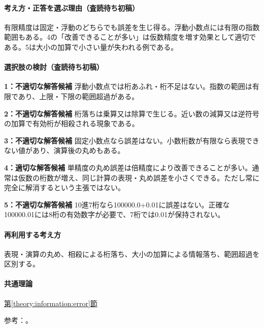 \paragraph{考え方・正答を選ぶ理由（査読待ち初稿）} 有限精度は固定・浮動のどちらでも誤差を生じ得る。浮動小数点には有限の指数範囲もある。4の「改善できることが多い」は仮数精度を増す効果として適切である。5は大小の加算で小さい量が失われる例である。

\paragraph{選択肢の検討（査読待ち初稿）}\mbox{}\par

\noindent\textbf{1：不適切な解答候補} 浮動小数点では桁あふれ・桁不足はない。指数の範囲は有限であり、上限・下限の範囲超過がある。\par

\noindent\textbf{2：不適切な解答候補} 桁落ちは乗算又は除算で生じる。近い数の減算又は逆符号の加算で有効桁が相殺される現象である。\par

\noindent\textbf{3：不適切な解答候補} 固定小数点なら誤差はない。小数桁数が有限なら表現できない値があり、演算後の丸めもある。\par

\noindent\textbf{4：適切な解答候補} 単精度の丸め誤差は倍精度により改善できることが多い。通常は仮数の桁数が増え、同じ計算の表現・丸め誤差を小さくできる。ただし常に完全に解消するという主張ではない。\par

\noindent\textbf{5：不適切な解答候補} 10進7桁なら100000.0+0.01に誤差はない。正確な100000.01には8桁の有効数字が必要で、7桁では0.01が保持されない。\par

\paragraph{再利用する考え方} 表現・演算の丸め、相殺による桁落ち、大小の加算による情報落ち、範囲超過を区別する。

\paragraph{共通理論} \hyperref[theory:information:error]{第\ref*{theory:information:error}節}

\par 参考：\cite{goldberg1991}。

